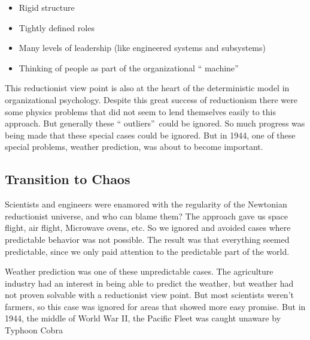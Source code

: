 \documentclass{article}
\begin{document}
\begin{itemize}
\item Rigid structure

\item Tightly defined roles

\item Many levels of leadership (like engineered systems and subsystems)

\item Thinking of people as part of the organizational \textquotedblleft
machine\textquotedblright
\end{itemize}

This reductionist view point is also at the heart of the deterministic model
in organizational psychology. Despite this great success of reductionism
there were some physics problems that did not seem to lend themselves easily
to this approach. But generally these \textquotedblleft
outliers\textquotedblright\ could be ignored. So much progress was being
made that these special cases could be ignored. But in 1944, one of these
special problems, weather prediction, was about to become important.

\subsection{Transition to Chaos}

Scientists and engineers were enamored with the regularity of the Newtonian
reductionist universe, and who can blame them? The approach gave us space
flight, air flight, Microwave ovens, etc. So we ignored and avoided cases
where predictable behavior was not possible. The result was that everything
seemed predictable, since we only paid attention to the predictable part of
the world.

Weather prediction was one of these unpredictable cases. The agriculture
industry had an interest in being able to predict the weather, but weather
had not proven solvable with a reductionist view point. But most scientists
weren't farmers, so this case was ignored for areas that showed more easy
promise. But in 1944, the middle of World War II, the Pacific Fleet was
caught unaware by Typhoon Cobra 
\end{document}
